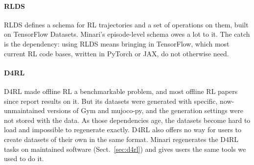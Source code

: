 \documentclass{article}
\begin{document}
\begin{table}[h]
    \centering
    \footnotesize
    \setlength{\tabcolsep}{4pt}
    \caption{Comparison of Minari with related dataset libraries and benchmarks for sequential decision-making. ``Reproducible'' denotes built-in mechanisms to reconstruct the data-generating environment (specs, seeds, wrappers, and software requirements); ``Hub sharing'' denotes one-command publishing/downloading to a community hub.}
    \label{tab:comparison}
\end{table}

\paragraph{RLDS} RLDS \citep{rlds} defines a schema for RL trajectories and a set of operations on them, built on TensorFlow Datasets. Minari's episode-level schema owes a lot to it. The catch is the dependency: using RLDS means bringing in TensorFlow, which most current RL code bases, written in PyTorch or JAX, do not otherwise need.

\paragraph{D4RL} D4RL \citep{d4rl} made offline RL a benchmarkable problem, and most offline RL papers since report results on it. But its datasets were generated with specific, now-unmaintained versions of Gym and mujoco-py, and the generation settings were not stored with the data. As those dependencies age, the datasets become hard to load and impossible to regenerate exactly. D4RL also offers no way for users to create datasets of their own in the same format. Minari regenerates the D4RL tasks on maintained software (Sect.~\ref{sec:d4rl}) and gives users the same tools we used to do it.
\end{document}
